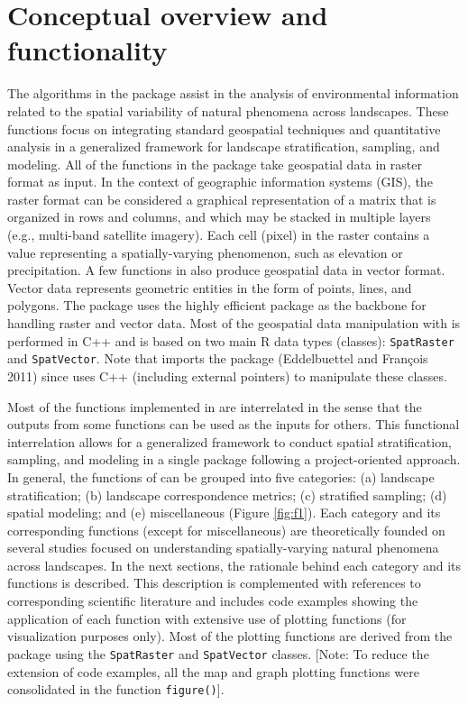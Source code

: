 \hypertarget{conceptual-overview-and-functionality}{%
\section{Conceptual overview and functionality}\label{conceptual-overview-and-functionality}}

The algorithms in the  package assist in the analysis of
environmental information related to the spatial variability of natural
phenomena across landscapes. These functions focus on integrating standard
geospatial techniques and quantitative analysis in a generalized framework for
landscape stratification, sampling, and modeling. All of the functions in the
 package take geospatial data in raster format as input. In the
context of geographic information systems (GIS), the raster format can be
considered a graphical representation of a matrix that is organized in rows and
columns, and which may be stacked in multiple layers (e.g., multi-band satellite
imagery). Each cell (pixel) in the raster contains a value representing a
spatially-varying phenomenon, such as elevation or precipitation. A few
functions in  also produce geospatial data in vector format. Vector
data represents geometric entities in the form of points, lines, and polygons.
The  package uses the highly efficient  package as the
backbone for handling raster and vector data. Most of the geospatial data
manipulation with  is performed in C++ and is based on two main R
data types (classes): \texttt{SpatRaster} and \texttt{SpatVector}. Note that 
imports the  package (Eddelbuettel and François 2011) since  uses
C++ (including external pointers) to manipulate these classes.

Most of the functions implemented in  are interrelated in the sense
that the outputs from some functions can be used as the inputs for others. This
functional interrelation allows for a generalized framework to conduct spatial
stratification, sampling, and modeling in a single package following a
project-oriented approach. In general, the functions of  can be
grouped into five categories: (a) landscape stratification; (b) landscape
correspondence metrics; (c) stratified sampling; (d) spatial modeling; and (e)
miscellaneous (Figure \ref{fig:f1}). Each category and its corresponding
functions (except for miscellaneous) are theoretically founded on several
studies focused on understanding spatially-varying natural phenomena across
landscapes. In the next sections, the rationale behind each category and its
functions is described. This description is complemented with references to
corresponding scientific literature and includes code examples showing the
application of each function with extensive use of plotting functions (for
visualization purposes only). Most of the plotting functions are derived from
the  package using the \texttt{SpatRaster} and \texttt{SpatVector} classes. {[}Note:
To reduce the extension of code examples, all the map and graph plotting
functions were consolidated in the function \texttt{figure()}{]}.


